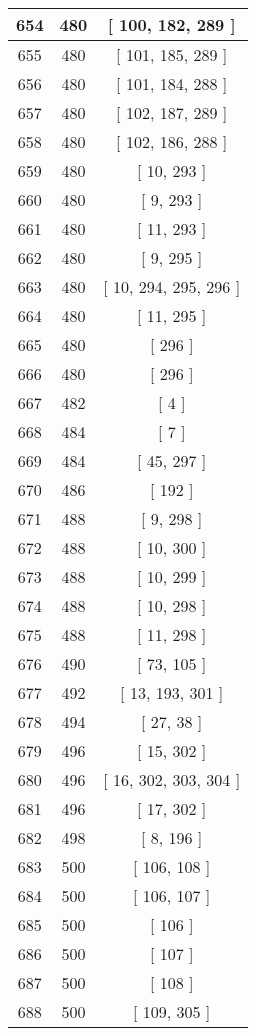 \begin{center}
\begin{longtable}[H]{|| c c c ||}
654 & 480 & [ 100, 182, 289 ]
\\\hline
655 & 480 & [ 101, 185, 289 ]
\\\hline
656 & 480 & [ 101, 184, 288 ]
\\\hline
657 & 480 & [ 102, 187, 289 ]
\\\hline
658 & 480 & [ 102, 186, 288 ]
\\\hline
659 & 480 & [ 10, 293 ]
\\\hline
660 & 480 & [ 9, 293 ]
\\\hline
661 & 480 & [ 11, 293 ]
\\\hline
662 & 480 & [ 9, 295 ]
\\\hline
663 & 480 & [ 10, 294, 295, 296 ]
\\\hline
664 & 480 & [ 11, 295 ]
\\\hline
665 & 480 & [ 296 ]
\\\hline
666 & 480 & [ 296 ]
\\\hline
667 & 482 & [ 4 ]
\\\hline
668 & 484 & [ 7 ]
\\\hline
669 & 484 & [ 45, 297 ]
\\\hline
670 & 486 & [ 192 ]
\\\hline
671 & 488 & [ 9, 298 ]
\\\hline
672 & 488 & [ 10, 300 ]
\\\hline
673 & 488 & [ 10, 299 ]
\\\hline
674 & 488 & [ 10, 298 ]
\\\hline
675 & 488 & [ 11, 298 ]
\\\hline
676 & 490 & [ 73, 105 ]
\\\hline
677 & 492 & [ 13, 193, 301 ]
\\\hline
678 & 494 & [ 27, 38 ]
\\\hline
679 & 496 & [ 15, 302 ]
\\\hline
680 & 496 & [ 16, 302, 303, 304 ]
\\\hline
681 & 496 & [ 17, 302 ]
\\\hline
682 & 498 & [ 8, 196 ]
\\\hline
683 & 500 & [ 106, 108 ]
\\\hline
684 & 500 & [ 106, 107 ]
\\\hline
685 & 500 & [ 106 ]
\\\hline
686 & 500 & [ 107 ]
\\\hline
687 & 500 & [ 108 ]
\\\hline
688 & 500 & [ 109, 305 ]
\\\hline
\end{longtable}
\end{center}
